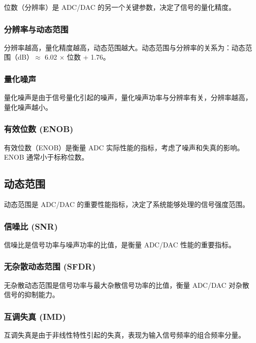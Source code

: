 \documentclass[UTF8]{ctexbook}
\begin{document}
位数（分辨率）是 ADC/DAC 的另一个关键参数，决定了信号的量化精度。

\subsubsection{分辨率与动态范围}

分辨率越高，量化精度越高，动态范围越大。动态范围与分辨率的关系为：动态范围（dB）$\approx$ 6.02 $\times$ 位数 + 1.76。

\subsubsection{量化噪声}

量化噪声是由于信号量化引起的噪声，量化噪声功率与分辨率有关，分辨率越高，量化噪声越小。

\subsubsection{有效位数 (ENOB)}

有效位数（ENOB）是衡量 ADC 实际性能的指标，考虑了噪声和失真的影响。ENOB 通常小于标称位数。

\subsection{动态范围}

动态范围是 ADC/DAC 的重要性能指标，决定了系统能够处理的信号强度范围。

\subsubsection{信噪比 (SNR)}

信噪比是信号功率与噪声功率的比值，是衡量 ADC/DAC 性能的重要指标。

\subsubsection{无杂散动态范围 (SFDR)}

无杂散动态范围是信号功率与最大杂散信号功率的比值，衡量 ADC/DAC 对杂散信号的抑制能力。

\subsubsection{互调失真 (IMD)}

互调失真是由于非线性特性引起的失真，表现为输入信号频率的组合频率分量。
\end{document}
